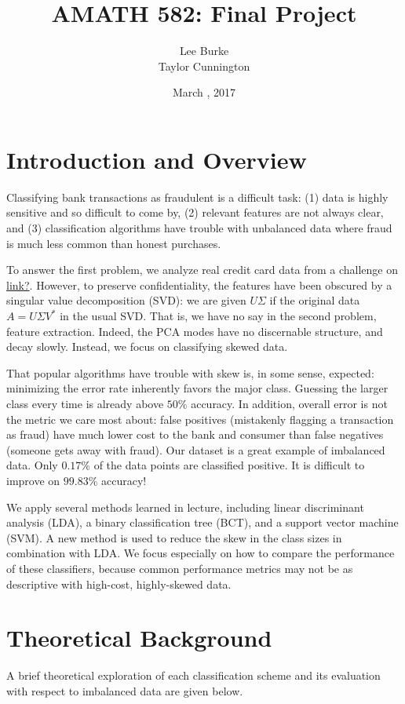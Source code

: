 \documentclass{article}
\title{AMATH 582: Final Project}
\date{March \nth{16}, 2017}
\author{Lee Burke \\ Taylor Cunnington}
\begin{document}
\maketitle
\abstract{
}
\section{Introduction and Overview}
Classifying bank transactions as fraudulent is a difficult task: (1) data is highly sensitive and so difficult to come by, (2) relevant features are not always clear, and (3) classification algorithms have trouble with unbalanced data where fraud is much less common than honest purchases.


To answer the first problem, we analyze real credit card data from a challenge on \href{kaggle.com}{link?}. However, to preserve confidentiality, the features have been obscured by a singular value decomposition (SVD): we are given $U\Sigma$ if the original data $A=U\Sigma V^\ast$ in the usual SVD. That is, we have no say in the second problem, feature extraction. Indeed, the PCA modes have no discernable structure, and decay slowly. Instead, we focus on classifying skewed data.

That popular algorithms have trouble with skew is, in some sense, expected: minimizing the error rate inherently favors the major class. Guessing the larger class every time is already above $50\%$ accuracy. In addition, overall error is not the metric we care most about: false positives (mistakenly flagging a transaction as fraud) have much lower cost to the bank and consumer than false negatives (someone gets away with fraud). Our dataset is a great example of imbalanced data. Only $0.17\%$ of the data points are classified positive. It is difficult to improve on $99.83\%$ accuracy!

We apply several methods learned in lecture, including linear discriminant analysis (LDA), a binary classification tree (BCT), and a support vector machine (SVM). A new method is used to reduce the skew in the class sizes in combination with LDA. We focus especially on how to compare the performance of these classifiers, because common performance metrics may not be as descriptive with high-cost, highly-skewed data.

\section{Theoretical Background}
A brief theoretical exploration of each classification scheme and its evaluation with respect to imbalanced data are given below.
\end{document}
